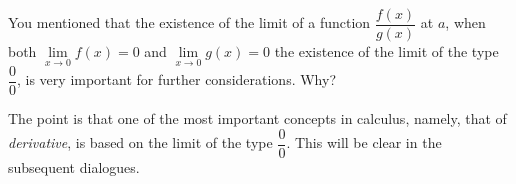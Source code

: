 {\rdr You mentioned that the existence of the limit of a function $ \dfrac{f(x)}{g(x)}$ at $a$, when both  $\lim\limits_{x \to 0} f(x) = 0$ and $\lim\limits_{x \to 0} g(x) = 0$ the existence of the limit of the type $\dfrac{0}{0}$, is very important for further considerations. Why? 

\athr The point is that one of the most important concepts in calculus, namely, that of \emph{derivative}, is based on the limit of the type $\dfrac{0}{0}$. This will be clear in the subsequent dialogues.
}